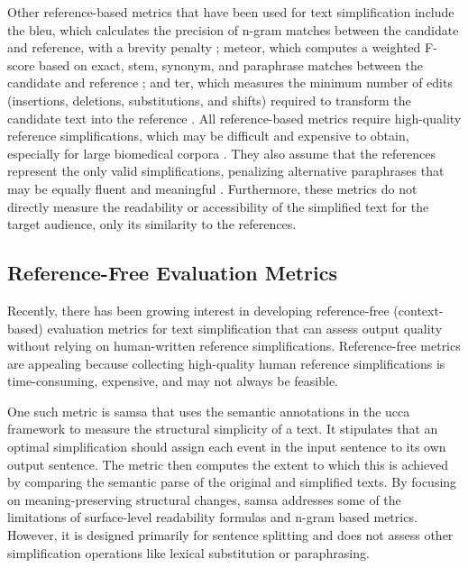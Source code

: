 Other reference-based metrics that have been used for text simplification include the \gls{bleu}, which calculates the precision of n-gram matches between the candidate and reference, with a brevity penalty \cite{papineni-etal-2002-bleu}; \gls{meteor}, which computes a weighted F-score based on exact, stem, synonym, and paraphrase matches between the candidate and reference \cite{banerjee-lavie-2005-meteor}; and \gls{ter}, which measures the minimum number of edits (insertions, deletions, substitutions, and shifts) required to transform the candidate text into the reference \cite{snover-etal-2006-study}.
All reference-based metrics require high-quality reference simplifications, which may be difficult and expensive to obtain, especially for large biomedical corpora \cite{alva-manchego-etal-2021-un, 94205144dd7945cc99b5a6544451b668, deutsch-etal-2022-limitations}. 
They also assume that the references represent the only valid simplifications, penalizing alternative paraphrases that may be equally fluent and meaningful \cite{sottana2023evaluationmetricseragpt4, huang-kochmar-2024-referee, lyu2024scigispynovelmetricbiomedical}. 
Furthermore, these metrics do not directly measure the readability or accessibility of the simplified text for the target audience, only its similarity to the references.

\subsection{Reference-Free Evaluation Metrics}

Recently, there has been growing interest in developing reference-free (context-based) evaluation metrics for text simplification that can assess output quality without relying on human-written reference simplifications. 
Reference-free metrics are appealing because collecting high-quality human reference simplifications is time-consuming, expensive, and may not always be feasible.

One such metric is \gls{samsa} \cite{sulem-etal-2018-semantic} that uses the semantic annotations in the \gls{ucca} framework to measure the structural simplicity of a text. 
It stipulates that an optimal simplification should assign each event in the input sentence to its own output sentence. 
The metric then computes the extent to which this is achieved by comparing the semantic parse of the original and simplified texts. 
By focusing on meaning-preserving structural changes, \gls{samsa} addresses some of the limitations of surface-level readability formulas and n-gram based metrics. 
However, it is designed primarily for sentence splitting and does not assess other simplification operations like lexical substitution or paraphrasing.

